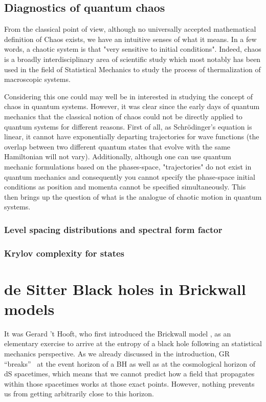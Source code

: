 \documentclass[11pt,a4paper]{article}
\begin{document}
\subsection{Diagnostics of quantum chaos}

From the classical point of view, although no universally accepted mathematical definition of Chaos exists, we have an intuitive senses of what it means. In a few words, a chaotic system is that "very sensitive to initial conditions". Indeed, chaos is a broadly interdisciplinary area of scientific study which most notably has been used in the field of Statistical Mechanics to study the process of thermalization of macroscopic systems.

Considering this one could may well be in interested in studying the concept of chaos in quantum systems. However, it was clear since the early days of quantum mechanics that the classical notion of chaos could not be directly applied to quantum systems for different reasons. First of all, as Schrödinger's equation is linear, it cannot have exponentially departing trajectories for wave functions (the overlap between two different quantum states that evolve with the same Hamiltonian will not vary). Additionally, although one can use quantum mechanic formulations based on the phases-space, "trajectories" do not exist in quantum mechanics and consequently you cannot specify the phase-space initial conditions as position and momenta cannot be specified simultaneously. This then brings up the question of what is the analogue of chaotic motion in quantum systems.

\subsubsection{Level spacing distributions and spectral form factor}

\subsubsection{Krylov complexity for states}

%    

\section{de Sitter Black holes in Brickwall models}

It was Gerard 't Hooft, who first introduced the Brickwall model \cite{tHooft:1984kcu}, as an elementary exercise to arrive at the entropy of a black hole following an statistical mechanics perspective. As we already discussed in the introduction, GR \textquotedblleft breaks\textquotedblright~  at the event horizon of a BH as well as at the cosmological horizon of dS spacetimes, which means that we cannot predict how a field that propagates within those spacetimes works at those exact points. However, nothing prevents us from getting arbitrarily close to this horizon.
\end{document}
